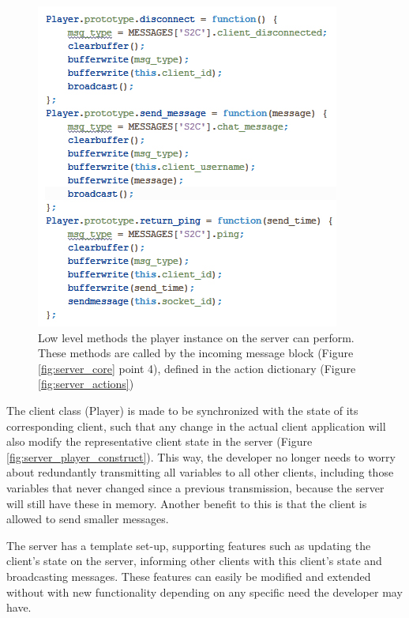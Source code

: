 \documentclass[bsc, 12pt, twoside, singlespacing, parskip, abbrevs, notimes, normalheadings, logo]{styles/infthesis}
\begin{document}
\begin{figure}
\includegraphics[scale=0.65]{images/server_player_functions.jpg}
\caption{Low level methods the player instance on the server can perform. These methods are called by the incoming message block (Figure \ref{fig:server_core} point 4), defined in the action dictionary (Figure \ref{fig:server_actions})}
\label{fig:server_player_functions}
\end{figure}

The client class (Player) is made to be synchronized with the state of its corresponding client, such that any change in the actual client application will also modify the representative client state in the server (Figure \ref{fig:server_player_construct}). This way, the developer no longer needs to worry about redundantly transmitting all variables to all other clients, including those variables that never changed since a previous transmission, because the server will still have these in memory. Another benefit to this is that the client is allowed to send smaller messages.

The server has a template set-up, supporting features such as updating the client's state on the server, informing other clients with this client's state and broadcasting messages. These features can easily be modified and extended without with new functionality depending on any specific need the developer may have.
\end{document}
